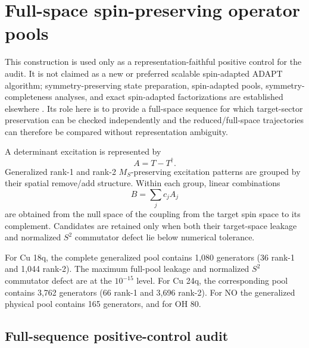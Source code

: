 \documentclass[
 aip,
 jcp,
 amsmath,amssymb,
 preprint
]{revtex4-2}
\begin{document}
\section{Full-space spin-preserving operator pools}

This construction is used only as a representation-faithful positive control for the audit.
It is not claimed as a new or preferred scalable spin-adapted ADAPT algorithm; symmetry-preserving state preparation, spin-adapted pools, symmetry-completeness analyses, and exact spin-adapted factorizations are established elsewhere \cite{gard2020symmetry,shkolnikov2023roadblocks,burton2023disco,magoulas2026symmetry,magoulas2025closedform,jain2026factorization}.
Its role here is to provide a full-space sequence for which target-sector preservation can be checked independently and the reduced/full-space trajectories can therefore be compared without representation ambiguity.

A determinant excitation is represented by
\begin{equation}
A=T-T^\dagger.
\end{equation}
Generalized rank-1 and rank-2 $M_S$-preserving excitation patterns are grouped by their spatial remove/add structure.
Within each group, linear combinations
\begin{equation}
B=\sum_j c_jA_j
\end{equation}
are obtained from the null space of the coupling from the target spin space to its complement.
Candidates are retained only when both their target-space leakage and normalized $S^2$ commutator defect lie below numerical tolerance.

For Cu 18q, the complete generalized pool contains 1,080 generators (36 rank-1 and 1,044 rank-2).
The maximum full-pool leakage and normalized $S^2$ commutator defect are at the $10^{-15}$ level.
For Cu 24q, the corresponding pool contains 3,762 generators (66 rank-1 and 3,696 rank-2).
For NO the generalized physical pool contains 165 generators, and for OH 80.

\subsection{Full-sequence positive-control audit}
\end{document}
